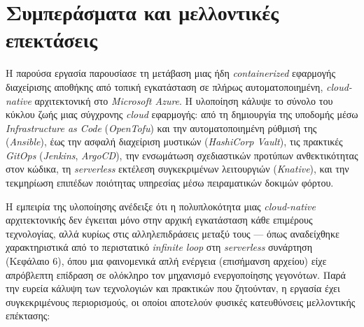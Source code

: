\newpage
\section*{Συμπεράσματα και μελλοντικές επεκτάσεις}

Η παρούσα εργασία παρουσίασε τη μετάβαση μιας ήδη \textit{containerized} εφαρμογής διαχείρισης αποθήκης από τοπική εγκατάσταση σε πλήρως αυτοματοποιημένη, \textit{cloud-native} αρχιτεκτονική στο \textit{Microsoft Azure}. Η υλοποίηση κάλυψε το σύνολο του κύκλου ζωής μιας σύγχρονης \textit{cloud} εφαρμογής: από τη δημιουργία της υποδομής μέσω \textit{Infrastructure as Code} (\textit{OpenTofu}) και την αυτοματοποιημένη ρύθμισή της (\textit{Ansible}), έως την ασφαλή διαχείριση μυστικών (\textit{HashiCorp Vault}), τις πρακτικές \textit{GitOps} (\textit{Jenkins}, \textit{ArgoCD}), την ενσωμάτωση σχεδιαστικών προτύπων ανθεκτικότητας στον κώδικα, τη \textit{serverless} εκτέλεση συγκεκριμένων λειτουργιών (\textit{Knative}), και την τεκμηρίωση επιπέδων ποιότητας υπηρεσίας μέσω πειραματικών δοκιμών φόρτου.

Η εμπειρία της υλοποίησης ανέδειξε ότι η πολυπλοκότητα μιας \textit{cloud-native} αρχιτεκτονικής δεν έγκειται μόνο στην αρχική εγκατάσταση κάθε επιμέρους τεχνολογίας, αλλά κυρίως στις αλληλεπιδράσεις μεταξύ τους --- όπως αναδείχθηκε χαρακτηριστικά από το περιστατικό \textit{infinite loop} στη \textit{serverless} συνάρτηση (Κεφάλαιο 6), όπου μια φαινομενικά απλή ενέργεια (επισήμανση αρχείου) είχε απρόβλεπτη επίδραση σε ολόκληρο τον μηχανισμό ενεργοποίησης γεγονότων. Παρά την ευρεία κάλυψη των τεχνολογιών και πρακτικών που ζητούνταν, η εργασία έχει συγκεκριμένους περιορισμούς, οι οποίοι αποτελούν φυσικές κατευθύνσεις μελλοντικής επέκτασης:

